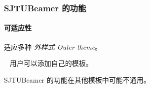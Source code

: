 \documentclass{ctexbeamer}
\begin{document}
\begin{frame}
  \frametitle{SJTUBeamer 的功能}

  \paragraph{可适应性} 适应多种 \emph{外样式 Outer theme}。

  ~
  用户可以添加自己的\alert{模板}。

   SJTUBeamer 的功能在其他模板中可能不通用。
\end{frame}
\end{document}
